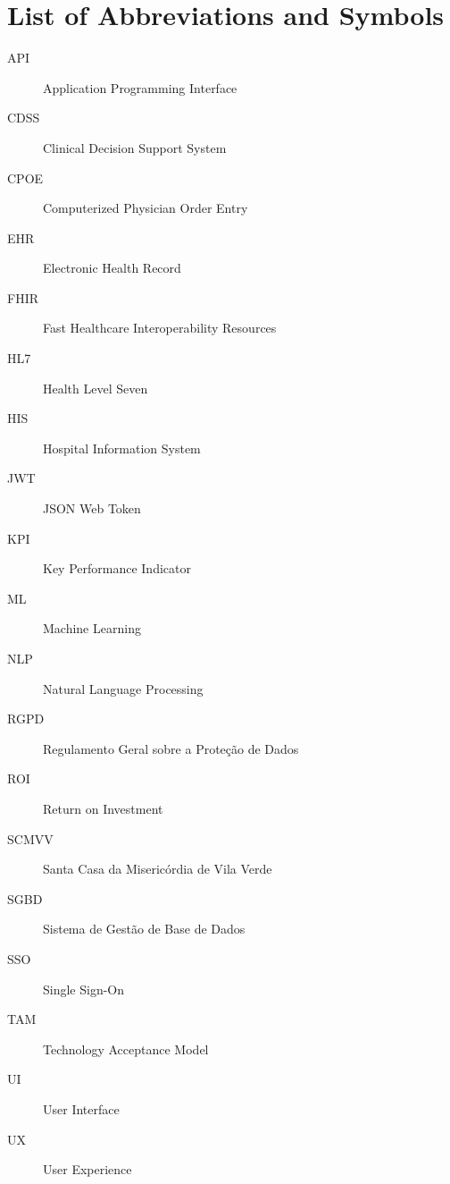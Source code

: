 \documentclass[12pt,a4paper]{report}
\author{Diogo André da Silva Esteves}
\begin{document}
\setlength{\parindent}{0em}




\setlength{\parskip}{0pt}
\setlength{\parindent}{1.5em}




\chapter*{List of Abbreviations and Symbols}

\begin{description}
\item[API] Application Programming Interface
\item[CDSS] Clinical Decision Support System
\item[CPOE] Computerized Physician Order Entry
\item[EHR] Electronic Health Record
\item[FHIR] Fast Healthcare Interoperability Resources
\item[HL7] Health Level Seven
\item[HIS] Hospital Information System
\item[JWT] JSON Web Token
\item[KPI] Key Performance Indicator
\item[ML] Machine Learning
\item[NLP] Natural Language Processing
\item[RGPD] Regulamento Geral sobre a Proteção de Dados
\item[ROI] Return on Investment
\item[SCMVV] Santa Casa da Misericórdia de Vila Verde
\item[SGBD] Sistema de Gestão de Base de Dados
\item[SSO] Single Sign-On
\item[TAM] Technology Acceptance Model
\item[UI] User Interface
\item[UX] User Experience
\end{description}

\cleardoublepage

\renewcommand{\contentsname}{Table of Contents}
\tableofcontents
\end{document}
